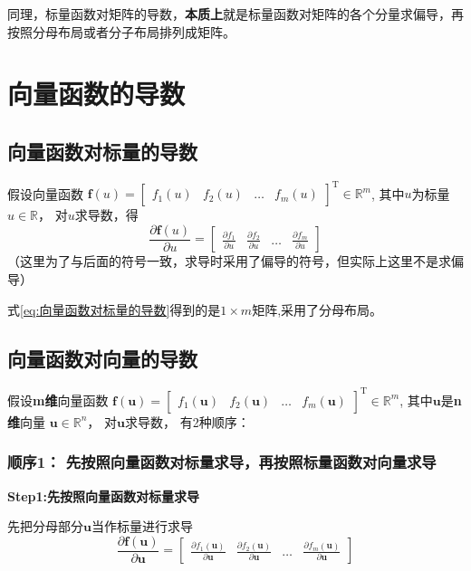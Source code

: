 \documentclass[withoutpreface,bwprint]{NoteBook}
\begin{document}
同理，标量函数对矩阵的导数，\textbf{本质上}就是标量函数对矩阵的各个分量求偏导，再按照分母布局或者分子布局排列成矩阵。


\section{向量函数的导数}
\subsection{向量函数对标量的导数}
假设向量函数
$\mathbf{f}(u) = 
\begin{bmatrix}
    f_1(u) & f_2(u) & \dots & f_m(u)
\end{bmatrix}^\mathrm{T} \in \mathbb{R}^m$,
其中$u$为标量$u \in \mathbb{R}$，
对$u$求导数，得
\begin{equation}
    \label{eq:向量函数对标量的导数}
    \frac{\partial \mathbf{f}(u)}{\partial u} = 
    \begin{bmatrix}
    \frac{\partial f_1}{\partial u} & \frac{\partial f_2}{\partial u} & \dots & \frac{\partial f_m}{\partial u}
    \end{bmatrix} 
\end{equation}
（这里为了与后面的符号一致，求导时采用了偏导的符号，但实际上这里不是求偏导）

式\cref{eq:向量函数对标量的导数}得到的是$1 \times m$矩阵,采用了分母布局。

\subsection{向量函数对向量的导数}
假设\textbf{m维}向量函数
$\mathbf{f}(\mathbf{u}) = 
\begin{bmatrix}
    f_1(\mathbf{u}) & f_2(\mathbf{u}) & \dots & f_m(\mathbf{u})
\end{bmatrix}^\mathrm{T} \in \mathbb{R}^m$,
其中$\mathbf{u}$是\textbf{n维}向量 $\mathbf{u} \in \mathbb{R}^n$，
对$\mathbf{u}$求导数，
有2种顺序：


\subsubsection{顺序1： 先按照向量函数对标量求导，再按照标量函数对向量求导}

\textbf{Step1:先按照向量函数对标量求导}

先把分母部分$\mathbf{u}$当作标量进行求导
\begin{equation}
    \label{eq:step1_向量函数对标量的导数}
    \frac{\partial \mathbf{f}(\mathbf{u})}{\partial \mathbf{u}} = 
    \begin{bmatrix}
    \frac{\partial f_1(\mathbf{u})}{\partial \mathbf{u}} & \frac{\partial f_2(\mathbf{u})}{\partial \mathbf{u}} & \dots & \frac{\partial f_m(\mathbf{u})}{\partial \mathbf{u}}
    \end{bmatrix} 
\end{equation}
\end{document}
